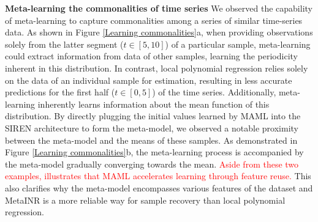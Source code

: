 \documentclass{article}
\begin{document}
\textbf{Meta-learning the commonalities of time series}
We observed the capability of meta-learning to capture commonalities among a series of similar time-series data.
As shown in Figure \ref{Learning commonalities}a, when providing observations solely from the latter segment ($t \in [5, 10]$) of a particular sample, 
meta-learning could extract information from data of other samples, learning the periodicity inherent in this distribution. 
In contrast, local polynomial regression relies solely on the data of an individual sample for estimation, 
resulting in less accurate predictions for the first half ($t \in [0, 5]$) of the time series.
Additionally, meta-learning inherently learns information about the mean function of this distribution. 
By directly plugging the initial values learned by MAML into the SIREN architecture to form the meta-model,
we observed a notable proximity between the meta-model and the means of these samples. 
As demonstrated in Figure \ref{Learning commonalities}b, the meta-learning process is accompanied by the meta-model gradually converging towards the mean.
\textcolor{red}{Aside from these two examples, \cite{raghu2019rapid}  illustrates that MAML accelerates learning through feature reuse.}
This also clarifies why the meta-model encompasses various features of the dataset and MetaINR is a more reliable way for sample recovery than local polynomial regression. 



\end{document}
